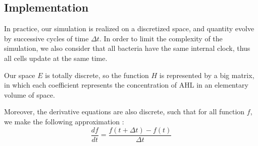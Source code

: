 \documentclass[a4paper]{article}
\theoremstyle{definition}
\begin{document}
\subsection{Implementation}

In practice, our simulation is realized on a discretized space, and quantity evolve by successive cycles of time $\Delta t$. In order to limit the complexity of the simulation, we also consider that all bacteria have the same internal clock, thus all cells update at the same time.

Our space $E$ is totally discrete, so the function $H$ is represented by a big matrix, in which each coefficient represents the concentration of AHL in an elementary volume of space.

Moreover, the derivative equations are also discrete, such that for all function $f$, we make the following approximation :
$$\frac{df}{dt} = \frac{f(t+\Delta t) - f(t)}{\Delta t}$$
\end{document}
